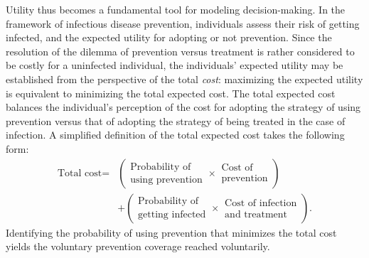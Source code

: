 Utility thus becomes a fundamental tool for modeling decision-making. In the framework of infectious disease prevention, individuals assess their risk of getting infected, and the expected utility for adopting or not prevention. Since the resolution of the dilemma of prevention versus treatment is rather considered to be costly for a uninfected individual, the individuals' expected utility may be established from the perspective of the total {\it cost}: maximizing the expected utility is equivalent to minimizing the total expected cost. The total expected cost balances the individual's perception of the cost for adopting the strategy of using prevention versus that of adopting the strategy of being treated in the case of infection. A simplified definition of the total expected cost takes the following form:
\begin{align*}
	\text{Total cost} = & \left( 
		\begin{array}{c}
		\text{Probability of}\\
		\text{using prevention}
		\end{array}
	 	\times 
		\begin{array}{c}
		\text{Cost of}\\
		\text{prevention}
		\end{array}
		\right)\\
	& + \left( 
		\begin{array}{c}
		\text{Probability of}\\
		\text{getting infected}
		\end{array}
	 	\times 
		\begin{array}{c}
		\text{Cost of infection}\\
		\text{and treatment}
		\end{array}
		\right).
\end{align*}
%
Identifying the probability of using prevention that minimizes the total cost yields the voluntary prevention coverage reached voluntarily.

